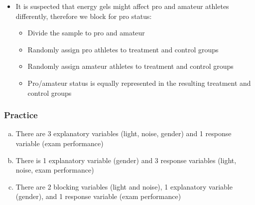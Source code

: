 \begin{frame}
{\begin{itemize}
\pause

\begin{itemize}
\item Treatment: energy gel
\item Control: no energy gel
\end{itemize}

\pause

\item It is suspected that energy gels might affect pro and amateur athletes differently, therefore we block for pro status:

\pause

\begin{itemize}
\item Divide the sample to pro and amateur
\item Randomly assign pro athletes to treatment and control groups
\item Randomly assign amateur athletes to treatment and control groups
\item Pro/amateur status is equally represented in the resulting treatment and control groups
\end{itemize}
\end{itemize}
}

\pause


\end{frame}


\begin{frame}
\frametitle{Practice}


\begin{enumerate}[(a)]
\item There are 3 explanatory variables (light, noise, gender) and 1 response variable (exam performance)
\item There is 1 explanatory variable (gender) and 3 response variables (light, noise, exam performance)
\item There are 2 blocking variables (light and noise), 1 explanatory variable (gender), and 1 response variable (exam performance)
\end{enumerate}

\end{frame}

